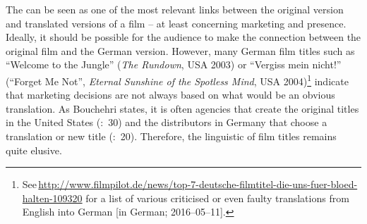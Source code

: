 The  can be seen as one of the most relevant links between the original version and translated versions of a film – at least concerning marketing and presence. Ideally, it should be possible for the audience to make the connection between the original film and the German version. However, many German film titles such as “Welcome to the Jungle” (\textit{The Rundown}, USA 2003) or “Vergiss mein nicht!” (“Forget Me Not”, \textit{Eternal Sunshine of the Spotless Mind}, USA 2004)\footnote{See\,\mbox{\url{http://www.filmpilot.de/news/top-7-deutsche-filmtitel-die-uns-fuer-bloed-halten-109320}} for a list of various criticised or even faulty  translations from English into German [in German; 2016--05--11].} indicate that marketing decisions are not always based on what would be an obvious translation. As Bouchehri states, it is often agencies that create the original titles in the United States (\citealt{Bouchehri2008}:~30) and the distributors in Germany that choose a translation or new title (\citealt{Bouchehri2008}:~20). Therefore, the linguistic  of film titles remains quite elusive.

